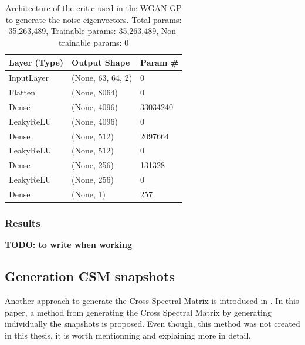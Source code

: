 \documentclass{article}
\begin{document}
\begin{table}[]
    \begin{tabular}{|l|l|l|}
        \hline
        \textbf{Layer (Type)} & \textbf{Output Shape} & \textbf{Param \#} \\ \hline
        InputLayer            & (None, 63, 64, 2)     & 0                 \\ \hline
        Flatten               & (None, 8064)          & 0                 \\ \hline
        Dense                 & (None, 4096)          & 33034240          \\ \hline
        LeakyReLU             & (None, 4096)          & 0                 \\ \hline
        Dense                 & (None, 512)           & 2097664           \\ \hline
        LeakyReLU             & (None, 512)           & 0                 \\ \hline
        Dense                 & (None, 256)           & 131328            \\ \hline
        LeakyReLU             & (None, 256)           & 0                 \\ \hline
        Dense                 & (None, 1)             & 257               \\ \hline
        \end{tabular}
    \caption{Architecture of the critic used in the WGAN-GP to generate the noise eigenvectors. Total params: 35,263,489, Trainable params: 35,263,489, Non-trainable params: 0}
    \label{tab:noise_evecs_critic_WGANGP_architecture}
\end{table}

\subsubsection{Results}

\textbf{TODO: to write when working}

\subsection{Generation CSM snapshots}

Another approach to generate the Cross-Spectral Matrix is introduced in \cite{gerstoft2020parametric}. In this paper, a method from generating the Cross Spectral Matrix by generating individually the snapshots is proposed. Even though, this method was not created in this thesis, it is worth mentionning and explaining more in detail.
\end{document}
